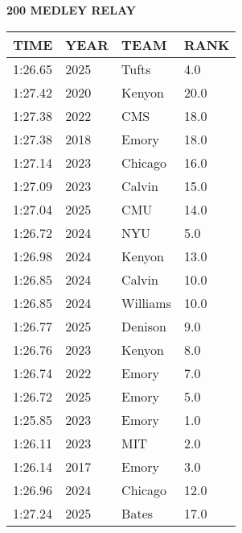 \begin{table}[H]
\centering
\begin{minipage}[t]{0.6\textwidth}
\centering
\textbf{200 MEDLEY RELAY}\\[0.1cm]
\begin{tabular}{@{}p{1.8cm}p{1.2cm}p{1.4cm}p{0.8cm}@{}}
\hline
    \textbf{TIME} & \textbf{YEAR} & \textbf{TEAM} & \textbf{RANK} \\
\hline
    1:26.65 & 2025 & Tufts & 4.0 \\
    1:27.42 & 2020 & Kenyon & 20.0 \\
    1:27.38 & 2022 & CMS & 18.0 \\
    1:27.38 & 2018 & Emory & 18.0 \\
    1:27.14 & 2023 & Chicago & 16.0 \\
    1:27.09 & 2023 & Calvin & 15.0 \\
    1:27.04 & 2025 & CMU & 14.0 \\
    1:26.72 & 2024 & NYU & 5.0 \\
    1:26.98 & 2024 & Kenyon & 13.0 \\
    1:26.85 & 2024 & Calvin & 10.0 \\
    1:26.85 & 2024 & Williams & 10.0 \\
    1:26.77 & 2025 & Denison & 9.0 \\
    1:26.76 & 2023 & Kenyon & 8.0 \\
    1:26.74 & 2022 & Emory & 7.0 \\
    1:26.72 & 2025 & Emory & 5.0 \\
    1:25.85 & 2023 & Emory & 1.0 \\
    1:26.11 & 2023 & MIT & 2.0 \\
    1:26.14 & 2017 & Emory & 3.0 \\
    1:26.96 & 2024 & Chicago & 12.0 \\
    1:27.24 & 2025 & Bates & 17.0 \\
\hline
\end{tabular}
\end{minipage}
\end{table}

